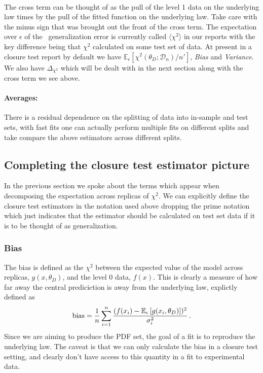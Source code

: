 \paragraph[]{}
The cross term can
be thought of as the pull of the level 1 data on the underlying law times by
the pull of the fitted function on the underlying law. Take care with the minus
sign that was brought out the front of the cross term. The expectation over
$\epsilon$ of the \nnpdf\ generalization error is currently called
$\langle \chi^2 \rangle$ in our reports with the key difference being that
$\chi^2$ calculated on some test set of data. At present in a closure
test report by default we have
$\mathbb{E}_{\epsilon}\left[\chi^2(\theta_D; \mathcal{D}_{n})/n'\right]$,
{\em Bias} and {\em Variance}. We also have $\Delta_{\chi^2}$ which will be
dealt with in the next section along with the cross term we see above.

\paragraph[]{Averages:} There is a residual dependence
on the splitting of data into in-sample and test sets, with fast fits one can
actually perform multiple fits on different splits and take compare the above
estimators across different splits.

\subsection{Completing the closure test estimator picture}

In the previous section we spoke about the terms which appear when decomposing
the expectation across replicas of $\chi^2$. We can explicitly define the
closure test estimators in the notation used above dropping the prime notation
which just indicates that the estimator should be calculated on test set data
if it is to be thought of as generalization.

\subsubsection*{Bias}

The bias is defined as the $\chi^2$ between the expected value of the model
across replicas, $g(x, \theta_D)$, and the level 0 data,
$f(x)$. This is clearly a measure of how far away the
central prediciction is away from the underlying law, explictly defined as
%
\begin{equation}
    \label{eq:Biasdef}
    \mathrm{bias} = \frac{1}{n} \sum_{i=1}^{n} \frac{(f(x_i) -
    \mathbb{E}_{\epsilon}\left[g(x_i,\theta_D)\right])^2}{\sigma_i^2} \, .
\end{equation}
%
Since we are aiming to produce the PDF set, the goal of a fit is to reproduce
the underlying law. The caveat is that we can only calculate the bias in a
closure test setting, and clearly don't have access to this quantity in a fit to
experimental data.

